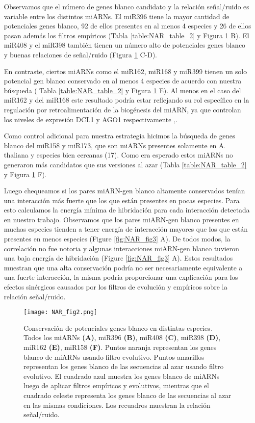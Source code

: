 Observamos que el número de genes blanco candidato y la relación señal/ruido es variable entre los distintos miARNs.
El miR396 tiene la mayor cantidad de potenciales genes blanco, 92 de ellos presentes en al menos 4 especies y 26 de ellos pasan además los filtros empíricos (Tabla \ref{table:NAR_table_2} y Figura \ref{fig:NAR_fig2} B).
El miR408 y el miR398 también tienen un número alto de potenciales genes blanco y buenas relaciones de señal/ruido (Figura \ref{fig:NAR_fig2} C-D).

En contraste, ciertos miARNs como el miR162, miR168 y miR399 tienen un solo potencial gen blanco conservado en al menos 4 especies de acuerdo con nuestra búsqueda ( Tabla \ref{table:NAR_table_2} y Figura \ref{fig:NAR_fig2} E).
Al menos en el caso del miR162 y del miR168 este resultado podría estar reflejando su rol específico en la regulación por retroalimentación de la biogénesis del miARN, ya que controlan los niveles de expresión DCL1 y AGO1 respectivamente \citep{Vazquez2004},\citep{Xie2003}.

Como control adicional para nuestra estrategia hicimos la búsqueda de genes blanco del miR158 y miR173, que son miARNs presentes solamente en A. thaliana y especies bien cercanas (17). Como era esperado estos miARNs no generaron más candidatos que sus versiones al azar (Tabla \ref{table:NAR_table_2} y Figura \ref{fig:NAR_fig2} F).


Luego chequeamos si los pares miARN-gen blanco altamente conservados tenían una interacción más fuerte que los que están presentes en pocas especies.
Para esto calculamos la energía mínima de hibridación para cada interacción detectada en nuestro trabajo. 
Observamos que los pares miARN-gen blanco presentes en muchas especies tienden a tener energía de interacción mayores que los que están presentes en menos especies (Figure \ref{fig:NAR_fig3} A).
De todos modos, la correlación no fue notoria y algunas interacciones miARN-gen blanco tuvieron una baja energía de hibridación (Figure \ref{fig:NAR_fig3} A).
Estos resultados muestran que una alta conservación podría no ser necesariamente equivalente a una fuerte interacción, la misma podría proporcionar una explicación para los efectos sinérgicos causados por los filtros de evolución y empíricos sobre la relación señal/ruido.

\begin{figure}[htbp!] 
    \centering    
    \texttt{[image: NAR\_fig2.png]}
    \caption[]{Conservación de potenciales genes blanco en distintas especies. Todos los miARNs 
    \textbf{(A)}, miR396 \textbf{(B)}, miR408 \textbf{(C)}, miR398 \textbf{(D)}, miR162 \textbf{(E)}, miR158 \textbf{(F)}.
    Puntos naranja representan los genes blanco de miARNs usando filtro evolutivo.
    Puntos amarillos representan los genes blanco de las secuencias al azar usando filtro evolutivo.
    El cuadrado azul muestra los genes blanco de miARNs luego de aplicar filtros empíricos y evolutivos, mientras que el cuadrado celeste representa los genes blanco de las secuencias al azar en las mismas condiciones.
    Los recuadros muestran la relación señal/ruido.}
    \label{fig:NAR_fig2}
\end{figure}

